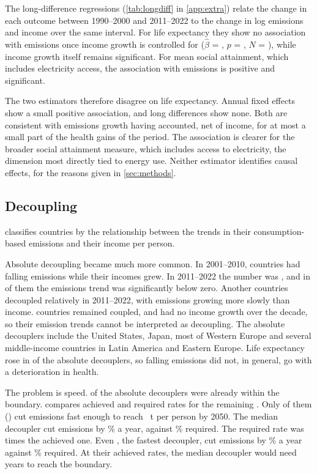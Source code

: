 The long-difference regressions (\cref{tab:longdiff} in \cref{app:extra}) relate the change in each outcome between 1990--2000 and 2011--2022 to the change in log emissions and income over the same interval. For life expectancy they show no association with emissions once income growth is controlled for ($\hat\beta$ = \nLdLE, $p$ = \nLdLEP, $N$ = \nLdN), while income growth itself remains significant. For mean social attainment, which includes electricity access, the association with emissions is positive and significant.

The two estimators therefore disagree on life expectancy. Annual fixed effects show a small positive association, and long differences show none. Both are consistent with emissions growth having accounted, net of income, for at most a small part of the health gains of the period. The association is clearer for the broader social attainment measure, which includes access to electricity, the dimension most directly tied to energy use. Neither estimator identifies causal effects, for the reasons given in \cref{sec:methods}.

\subsection{Decoupling}\label{sec:res-decoupling}

 classifies countries by the relationship between the trends in their consumption-based emissions and their income per person.



Absolute decoupling became much more common. In 2001--2010, \nDecAbsEarly{} countries had falling emissions while their incomes grew. In 2011--2022 the number was \nDecAbsLate, and in \nDecAbsLateRobust{} of them the emissions trend was significantly below zero. Another \nDecRelLate{} countries decoupled relatively in 2011--2022, with emissions growing more slowly than income. \nDecCoupledLate{} countries remained coupled, and \nDecNoGrowthLate{} had no income growth over the decade, so their emission trends cannot be interpreted as decoupling. The absolute decouplers include the United States, Japan, most of Western Europe and several middle-income countries in Latin America and Eastern Europe. Life expectancy rose in \nDecLEUp{} of the \nDecAbsLate{} absolute decouplers, so falling emissions did not, in general, go with a deterioration in health.

The problem is speed. \nDecAbsBelow{} of the absolute decouplers were already within the boundary.  compares achieved and required rates for the remaining \nDecAbsAbove. Only \nDecAboveOnTrack{} of them (\nDecAboveOnTrackList) cut emissions fast enough to reach \nBoundary~t per person by 2050. The median decoupler cut emissions by \nDecMedianAchieved\% a year, against \nDecMedianRequired\% required. The required rate was \nDecSpeedRatio{} times the achieved one. Even \nDecFastest, the fastest decoupler, cut emissions by \nDecFastestRate\% a year against \nDecFastestRequired\% required. At their achieved rates, the median decoupler would need \nDecMedianYears{} years to reach the boundary.

